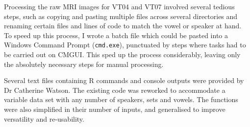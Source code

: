 Processing the raw MRI images for VT04 and VT07 involved several tedious steps, such as copying and pasting multiple files across several directories and renaming certain files and lines of code to match the vowel or speaker at hand. To speed up this process, I wrote a batch file which could be pasted into a Windows Command Prompt (\verb|cmd.exe|), punctuated by steps where tasks had to be carried out on CMGUI. This sped up the process considerably, leaving only the absolutely necessary steps for manual processing.

Several text files containing R commands and console outputs were provided by Dr Catherine Watson. The existing code was reworked to accommodate a variable data set with any number of speakers, sets and vowels. The functions were also simplified in their number of inputs, and generalised to improve versatility and re-usability.